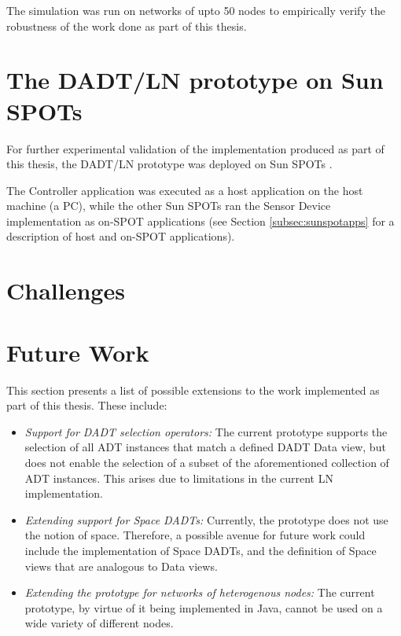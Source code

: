 The simulation was run on networks of upto 50 nodes to empirically verify the
robustness of the work done as part of this thesis.

\section{The DADT/LN prototype on Sun SPOTs}

For further experimental validation of the implementation produced as part of 
this thesis,
the DADT/LN prototype was deployed on Sun SPOTs \cite{simon_squawk:2006}. 

The
Controller application was executed as a host application on the host machine (a
PC), while the other Sun SPOTs ran the Sensor Device implementation as on-SPOT
applications (see Section \ref{subsec:sunspotapps} for a description of host and on-SPOT
applications).

\section{Challenges}


\section{Future Work}

This section presents a list of possible extensions to the work implemented as
part of this thesis. These include:

\begin{itemize}
  \item \emph{Support for DADT selection operators:} The current prototype
  supports the selection of all ADT instances that match a defined DADT Data
  view, but does not enable the selection of a subset of the aforementioned
  collection of ADT instances. This arises due to limitations in the current LN implementation.
  \item \emph{Extending support for Space DADTs:} Currently, the prototype does
  not use the notion of space. Therefore, a possible avenue for future work
  could include the implementation of Space DADTs, and the definition of Space
  views that are analogous to Data views.
  \item \emph{Extending the prototype for networks of heterogenous nodes:}
  The current prototype, by virtue of it being implemented in Java, cannot be
  used on a wide variety of different nodes. 
\end{itemize}


